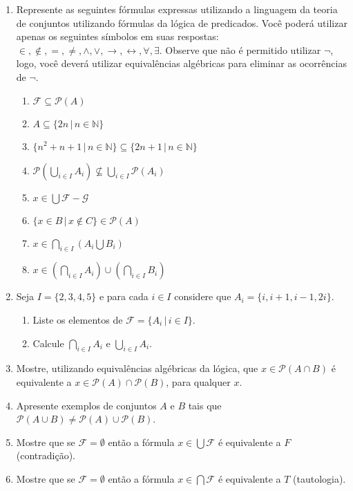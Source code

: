 \begin{enumerate}
	\item Represente as seguintes f\'ormulas expressas utilizando a linguagem da teoria de conjuntos
	      utilizando f\'ormulas da l\'ogica de predicados. Voc\^e poder\'a utilizar apenas
	      os seguintes s\'imbolos em suas respostas: $\in,\not\in,=,\neq,\land,\lor,\rightarrow,\leftrightarrow,\forall,\exists$.
	      Observe que n\~ao \'e permitido utilizar $\neg$, logo, voc\^e dever\'a utilizar equival\^encias alg\'ebricas para eliminar
	      as ocorr\^encias de $\neg$.
	\begin{enumerate}
		\item $\mathcal{F}\subseteq\mathcal{P}(A)$
		\item $A\subseteq\{2n\, |\, n\in\mathbb{N}\}$
		\item $\{n^2 + n + 1\,|\, n\in\mathbb{N}\}\subseteq\{2n + 1\,|\,n\in\mathbb{N}\}$
		\item $\mathcal{P}(\bigcup_{i\in I}A_i)\not\subseteq \bigcup_{i\in I}\mathcal{P}(A_i)$
		\item $x\in\bigcup\mathcal{F} - \mathcal{G}$
		\item $\{x\in B\,|\,x\not\in C\}\in\mathcal{P}(A)$
		\item $x\in\bigcap_{i\in I}(A_i\bigcup B_i)$
		\item $x\in (\bigcap_{i\in I} A_i)\cup(\bigcap_{i \in I} B_i)$
	\end{enumerate}
	\item Seja $I=\{2,3,4,5\}$ e para cada $i\in I$ considere que $A_i=\{i , i+1, i -1, 2i\}$.
	\begin{enumerate}
		\item Liste os elementos de $\mathcal{F} = \{A_i\,|\,i\in I\}$.
		\item Calcule $\bigcap_{i \in I} A_i$ e $\bigcup_{i \in I} A_i$.
	\end{enumerate}
	\item Mostre, utilizando equival\^encias alg\'ebricas da l\'ogica, que $x\in\mathcal{P}(A\cap B)$ \'e equivalente a
              $x\in\mathcal{P}(A)\cap\mathcal{P}(B)$, para qualquer $x$.
        \item Apresente exemplos de conjuntos $A$ e $B$ tais que $\mathcal{P}(A\cup B)\neq \mathcal{P}(A) \cup \mathcal{P}(B)$.
	\item Mostre que se $\mathcal{F} = \emptyset$  ent\~ao a f\'ormula $x\in\bigcup\mathcal{F}$ \'e
              equivalente a $F$ (contradi\c{c}\~ao).
	\item Mostre que se $\mathcal{F} = \emptyset$  ent\~ao a f\'ormula $x\in\bigcap\mathcal{F}$ \'e
              equivalente a $T$ (tautologia).
\end{enumerate}


